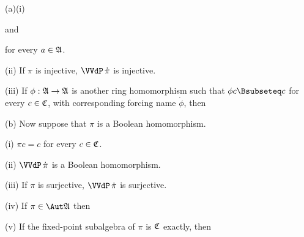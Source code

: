 (a)(i)


\noindent and


\noindent for every $a\in\frak A$.

\quad(ii) If $\pi$ is injective, $\VVdP\,\dot\pi$ is injective.

\quad(iii) If $\phi:\frak A\to\frak A$ is another ring homomorphism such
that $\phi c\Bsubseteq c$ for every $c\in\frak C$, with corresponding
forcing name $\dot\phi$, then


(b) Now suppose that $\pi$ is a Boolean homomorphism.

\quad(i) $\pi c=c$ for every $c\in\frak C$.

\quad(ii) $\VVdP\,\dot\pi$ is a Boolean homomorphism.

\quad(iii) If $\pi$ is surjective, $\VVdP\,\dot\pi$ is surjective.

\quad(iv) If $\pi\in\Aut\frak A$ then


\quad(v) If the fixed-point subalgebra of $\pi$ is $\frak C$ exactly, then


